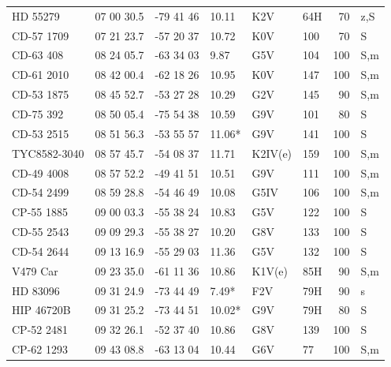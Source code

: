 \documentclass[11pt,twoside]{book}
\begin{document}
\begin{table}[!h]
{\begin{tabular}{lcclll@{\hskip7pt}r@{\hskip7pt}l}
HD 55279    &07 00 30.5&    -79 41 46&     10.11    &   K2V  &\hspace{2mm}64H&70&z,S\\
CD-57 1709&  07 21 23.7 & -57 20 37&        10.72  &      K0V     & 100   &70&S\\
CD-63 408 & 08 24 05.7& -63 34 03 &         \hspace{2mm}9.87   &     G5V &104&100&S,m\\
CD-61 2010 & 08 42 00.4& -62 18 26 &          10.95  &     K0V & 147&100&S,m\\
CD-53 1875& 08 45 52.7& -53 27 28 &          10.29       &     G2V & 145&90&S,m\\
CD-75 392 & 08 50 05.4 & -75 54 38 &        10.59  &  G9V    &101&80&S\\
CD-53 2515& 08 51 56.3& -53 55 57 &          11.06*  &     G9V & 141&100&S\\
TYC8582-3040  & 08 57 45.7& -54 08 37 &          11.71   &  K2IV(e)&159&100&S,m\\
CD-49 4008  &08 57 52.2&    -49 41 51&      10.51  &    G9V    &111&100&S,m\\
CD-54 2499  &08 59 28.8&    -54 46 49&     10.08   &    G5IV  &106&100&S,m\\
CP-55 1885& 09 00 03.3& -55 38 24 &        10.83     &     G5V & 122 &100&S\\
CD-55 2543& 09 09 29.3& -55 38 27 &        10.20         &     G8V & 133&100&S\\
CD-54 2644& 09 13 16.9& -55 29 03 &        11.36    &     G5V & 132&100&S\\
V479 Car    &09 23 35.0&    -61 11 36&     10.86   &    K1V(e)  &\hspace{2mm}85H&90&S,m\\
HD 83096 & 09 31 24.9& -73 44 49 &         \hspace{2mm}7.49*  &     F2V&\hspace{2mm}79H&90&s\\
HIP 46720B & 09 31 25.2& -73 44 51 &        10.02*&     G9V &\hspace{2mm}79H&80&S\\
CP-52 2481& 09 32 26.1& -52 37 40 &        10.86     &     G8V & 139&100&S\\
CP-62 1293  &09 43 08.8&    -63 13 04&     10.44   &    G6V  &\hspace{2mm}77&100&S,m\\

\end{tabular}}
\end{table}
\end{document}
